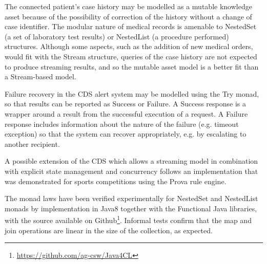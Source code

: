 \documentclass[runningheads]{llncs}
\begin{document}
The connected patient's case history may be modelled as a mutable knowledge asset  because of the possibility of correction of the history without a change of case identifier. The modular nature of medical records is amenable to NestedSet (a set of laboratory test results) or NestedList (a procedure performed) structures. Although some aspects, such as the addition of new medical orders, would fit with the Stream structure, queries of the case history are not expected to produce streaming results, and so the mutable asset model is a better fit than a Stream-based model.

Failure recovery in the CDS alert system may be modelled using the Try monad, so that results can be reported as Success or Failure. A Success response is a wrapper around a result from the successful execution of a request. A Failure response includes information about the nature of the failure (e.g. timeout exception) so that the system can recover appropriately, e.g. by escalating to another recipient.

A possible extension of the CDS which allows a streaming model in combination with explicit state management and concurrency follows an implementation\cite{JefferyKP09} that was demonstrated for sports competitions using the Prova rule engine\cite{Prova2012}. 


The monad laws have been verified experimentally for NestedSet and NestedList monads by implementation in Java8 together with the Functional Java\cite{FJ} libraries, with the source available on Github\footnote{\url{https://github.com/ag-csw/Java4CL}}. Informal tests confirm that the map and join operations are linear in the size of the collection, as expected.
\end{document}
